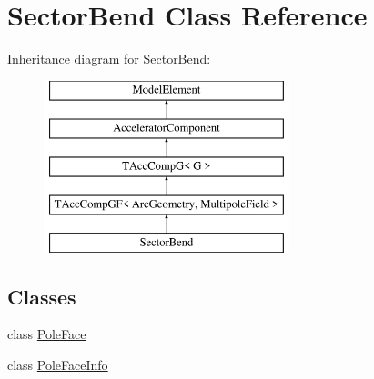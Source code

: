 \hypertarget{classSectorBend}{}\section{Sector\+Bend Class Reference}
\label{classSectorBend}
Inheritance diagram for Sector\+Bend\+:\begin{figure}[H]
\begin{center}
\leavevmode
\includegraphics[height=5.000000cm]{classSectorBend}
\end{center}
\end{figure}
\subsection*{Classes}
\begin{DoxyCompactItemize}
\item 
class \hyperlink{classSectorBend_1_1PoleFace}{Pole\+Face}
\item 
class \hyperlink{classSectorBend_1_1PoleFaceInfo}{Pole\+Face\+Info}
\end{DoxyCompactItemize}
